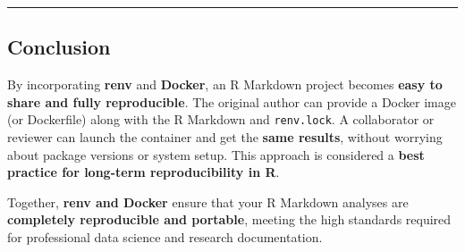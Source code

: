 \documentclass[
  11pt,
]{article}
\begin{document}
\begin{center}\rule{0.5\linewidth}{0.5pt}\end{center}

\subsection{Conclusion}\label{conclusion}

By incorporating \textbf{renv} and \textbf{Docker}, an R Markdown
project becomes \textbf{easy to share and fully reproducible}. The
original author can provide a Docker image (or Dockerfile) along with
the R Markdown and \texttt{renv.lock}. A collaborator or reviewer can
launch the container and get the \textbf{same results}, without worrying
about package versions or system setup. This approach is considered a
\textbf{best practice for long-term reproducibility in R}.

Together, \textbf{renv and Docker} ensure that your R Markdown analyses
are \textbf{completely reproducible and portable}, meeting the high
standards required for professional data science and research
documentation.
\end{document}
